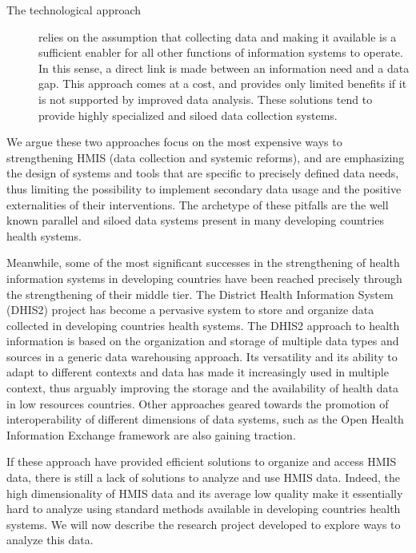 \begin{description}
	\item[The technological approach] relies on the assumption that collecting data and making it available is a sufficient enabler for all other functions of information systems to operate. In this sense, a direct link is made between an information need and a data gap. This approach comes at a cost, and provides only limited benefits if it is not supported by improved data analysis. These solutions tend to provide highly specialized and siloed data collection systems.

\end{description}

We argue these two approaches focus on the most expensive ways to strengthening HMIS (data collection and systemic reforms), and are emphasizing the design of systems and tools that are specific to precisely defined data needs, thus limiting the possibility to implement secondary data usage and the positive externalities of their interventions. The archetype of these pitfalls are the well known parallel and siloed data systems present in many developing countries health systems.

Meanwhile, some of the most significant successes in the strengthening of health information systems in developing countries have been reached precisely through the strengthening of their middle tier. The District Health Information System (DHIS2) project has become a pervasive system to store and organize data collected in developing countries health systems. The DHIS2 approach to health information is based on the organization and storage of multiple data types and sources in a generic data warehousing approach. Its versatility and its ability to adapt to different contexts and data has made it increasingly used in multiple context, thus arguably improving the storage and the availability of health data in low resources countries. Other approaches geared towards the promotion of interoperability of different dimensions of data systems, such as the Open Health Information Exchange framework are also gaining traction.


If these approach have provided efficient solutions to organize and access HMIS data, there is still a lack of solutions to analyze and use HMIS data. Indeed, the high dimensionality of HMIS data and its average low quality make it essentially hard to analyze using standard methods available in developing countries health systems. We will now describe the research project developed to explore ways to analyze this data.

